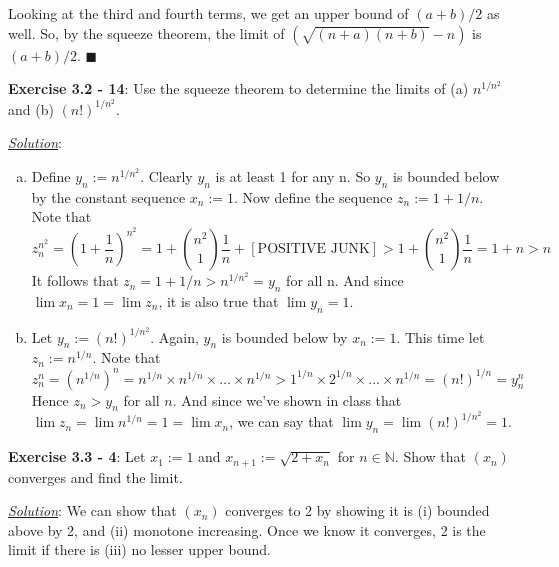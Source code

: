 \documentclass{article}
\begin{document}
Looking at the third and fourth terms, we get an upper bound of
$(a+b)/2$ as well. So, by the squeeze theorem, the limit of 
$(\sqrt{(n + a) (n + b)} - n)$ is $(a + b)/2$.
\hfill $\blacksquare$

\hrulefill

\textbf{Exercise 3.2 - 14}: Use the squeeze theorem to determine the limits
of (a) $n^{1/n^2}$ and (b) $(n!)^{1/n^2}$.

\underline{\textit{Solution}}:

\begin{enumerate}[(a)]

  \item Define $y_n:=n^{1/n^2}$. Clearly $y_n$ is at least 1 for any n.
    So $y_n$ is bounded below by the constant sequence $x_n:=1$.
    Now define the sequence $z_n := 1 + 1/n$. Note that
    \[
      z_n^{n^2}
      = (1 + \frac{1}{n})^{n^2}
      = 1 + {n^2 \choose 1} \frac{1}{n} + [\textrm{POSITIVE JUNK}]
      > 1 + {n^2 \choose 1} \frac{1}{n}
      = 1 + n
      > n
    \]
    It follows that $z_n = 1 + 1/n > n^{1/n^2} = y_n$ for all n.
    And since $\lim x_n = 1 = \lim z_n$, it is also true that
    $\lim y_n = 1$.

  \item Let $y_n := (n!)^{1/n^2}$. Again, $y_n$ is bounded below by
    $x_n := 1$. This time let $z_n := n^{1/n}$. Note that
    \[
      z_n^n
      = (n^{1/n})^n
      = n^{1/n} \times n^{1/n} \times \dots \times n^{1/n}
      > 1^{1/n} \times 2^{1/n} \times \dots \times n^{1/n}
      = (n!)^{1/n}
      = y_n^n
    \]
    Hence $z_n > y_n$ for all $n$. And since we've shown in class that
    $\lim z_n = \lim n^{1/n} = 1 = \lim x_n$, we can say that
    $\lim y_n = \lim (n!)^{1/n^2} = 1$.

\end{enumerate}

\hrulefill

\textbf{Exercise 3.3 - 4}:
Let $x_1 := 1$ and $x_{n+1} := \sqrt{2 + x_n}$ for $n \in \mathbb{N}$. Show
that $(x_n)$ converges and find the limit.

\underline{\textit{Solution}}: We can show that $(x_n)$ converges to 2 by
showing it is (i) bounded above by 2, and (ii) monotone increasing. Once we
know it converges, 2 is the limit if there is (iii) no lesser upper bound.
\end{document}
